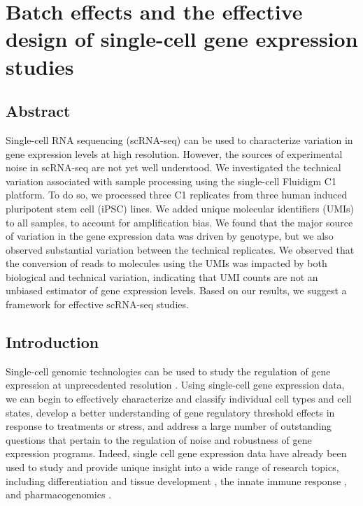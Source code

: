 \chapter{Batch effects and the effective design of single-cell gene expression studies}\label{ch:singleCellSeq}

\section[Abstract]{Abstract\footnotemark}

Single-cell RNA sequencing (scRNA-seq) can be used to characterize
variation in gene expression levels at high resolution. However, the
sources of experimental noise in scRNA-seq are not yet well
understood.  We investigated the technical variation associated with
sample processing using the single-cell Fluidigm C1 platform. To do
so, we processed three C1 replicates from three human induced
pluripotent stem cell (iPSC) lines. We added unique molecular
identifiers (UMIs) to all samples, to account for amplification
bias. We found that the major source of variation in the gene
expression data was driven by genotype, but we also observed
substantial variation between the technical replicates. We observed
that the conversion of reads to molecules using the UMIs was impacted
by both biological and technical variation, indicating that UMI counts
are not an unbiased estimator of gene expression levels. Based on our
results, we suggest a framework for effective scRNA-seq studies.


\section{Introduction}\label{ch04-introduction}

Single-cell genomic technologies can be used to study the regulation
of gene expression at unprecedented resolution \citep{Macaulay2014,
  Saliba2014}. Using single-cell gene expression data, we can begin to
effectively characterize and classify individual cell types and cell
states, develop a better understanding of gene regulatory threshold
effects in response to treatments or stress, and address a large
number of outstanding questions that pertain to the regulation of
noise and robustness of gene expression programs. Indeed, single cell
gene expression data have already been used to study and provide
unique insight into a wide range of research topics, including
differentiation and tissue development \citep{Macosko2015, Handel2016,
  Drissen2016}, the innate immune response \citep{Shalek2013,
  Jaitin2014}, and pharmacogenomics \citep{Miyamoto2015, Kim2015}.

